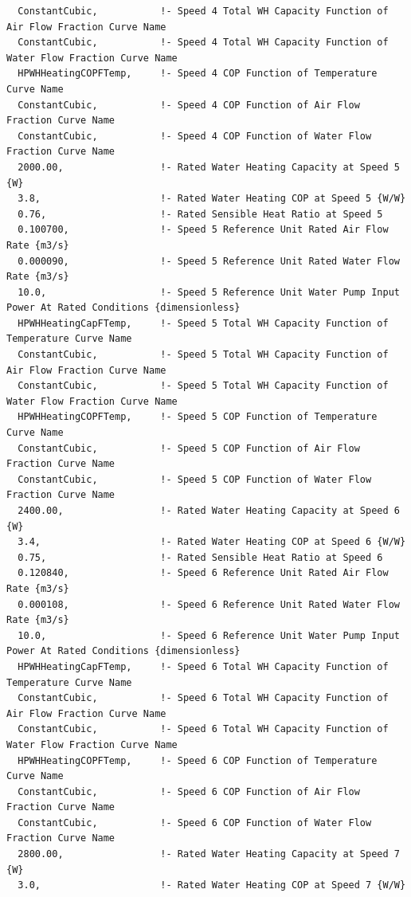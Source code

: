 \begin{lstlisting}
  ConstantCubic,           !- Speed 4 Total WH Capacity Function of Air Flow Fraction Curve Name
  ConstantCubic,           !- Speed 4 Total WH Capacity Function of Water Flow Fraction Curve Name
  HPWHHeatingCOPFTemp,     !- Speed 4 COP Function of Temperature Curve Name
  ConstantCubic,           !- Speed 4 COP Function of Air Flow Fraction Curve Name
  ConstantCubic,           !- Speed 4 COP Function of Water Flow Fraction Curve Name
  2000.00,                 !- Rated Water Heating Capacity at Speed 5 {W}
  3.8,                     !- Rated Water Heating COP at Speed 5 {W/W}
  0.76,                    !- Rated Sensible Heat Ratio at Speed 5
  0.100700,                !- Speed 5 Reference Unit Rated Air Flow Rate {m3/s}
  0.000090,                !- Speed 5 Reference Unit Rated Water Flow Rate {m3/s}
  10.0,                    !- Speed 5 Reference Unit Water Pump Input Power At Rated Conditions {dimensionless}
  HPWHHeatingCapFTemp,     !- Speed 5 Total WH Capacity Function of Temperature Curve Name
  ConstantCubic,           !- Speed 5 Total WH Capacity Function of Air Flow Fraction Curve Name
  ConstantCubic,           !- Speed 5 Total WH Capacity Function of Water Flow Fraction Curve Name
  HPWHHeatingCOPFTemp,     !- Speed 5 COP Function of Temperature Curve Name
  ConstantCubic,           !- Speed 5 COP Function of Air Flow Fraction Curve Name
  ConstantCubic,           !- Speed 5 COP Function of Water Flow Fraction Curve Name
  2400.00,                 !- Rated Water Heating Capacity at Speed 6 {W}
  3.4,                     !- Rated Water Heating COP at Speed 6 {W/W}
  0.75,                    !- Rated Sensible Heat Ratio at Speed 6
  0.120840,                !- Speed 6 Reference Unit Rated Air Flow Rate {m3/s}
  0.000108,                !- Speed 6 Reference Unit Rated Water Flow Rate {m3/s}
  10.0,                    !- Speed 6 Reference Unit Water Pump Input Power At Rated Conditions {dimensionless}
  HPWHHeatingCapFTemp,     !- Speed 6 Total WH Capacity Function of Temperature Curve Name
  ConstantCubic,           !- Speed 6 Total WH Capacity Function of Air Flow Fraction Curve Name
  ConstantCubic,           !- Speed 6 Total WH Capacity Function of Water Flow Fraction Curve Name
  HPWHHeatingCOPFTemp,     !- Speed 6 COP Function of Temperature Curve Name
  ConstantCubic,           !- Speed 6 COP Function of Air Flow Fraction Curve Name
  ConstantCubic,           !- Speed 6 COP Function of Water Flow Fraction Curve Name
  2800.00,                 !- Rated Water Heating Capacity at Speed 7 {W}
  3.0,                     !- Rated Water Heating COP at Speed 7 {W/W}

\end{lstlisting}
